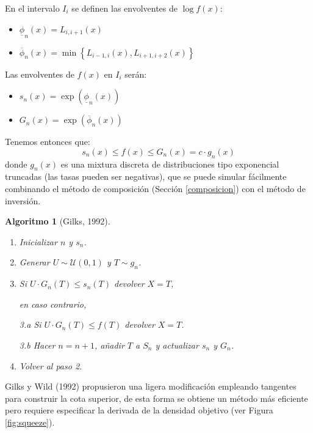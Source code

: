 \documentclass[
]{book}
\theoremstyle{break}
\newtheorem{conjecture}{Algoritmo}[chapter]
\theoremstyle{nonumberplain}
\begin{document}
En el intervalo \(I_{i}\) se definen las envolventes de \(\log f\left( x\right)\):

\begin{itemize}
\item
  \(\underline{\phi}_n(x)=L_{i,i+1}(x)\)
\item
  \(\overline{\phi}_n(x)=\min \left\{L_{i-1,i}(x),L_{i+1,i+2}(x)\right\}\)
\end{itemize}

Las envolventes de \(f(x)\) en \(I_{i}\) serán:

\begin{itemize}
\item
  \(s_n(x)=\exp \left( \underline{\phi}_n(x)\right)\)
\item
  \(G_n(x)=\exp \left( \overline{\phi}_n(x)\right)\)
\end{itemize}

Tenemos entonces que:
\[s_n(x)\leq f(x) \leq G_n(x)=c\cdot g_n(x)\]
donde \(g_n(x)\) es una mixtura discreta de distribuciones tipo exponencial truncadas (las tasas pueden ser negativas), que se puede simular fácilmente combinando el método de composición (Sección \ref{composicion}) con el método de inversión.

\begin{conjecture}[Gilks, 1992]
\protect\hypertarget{cnj:gilks}{}\label{cnj:gilks}

\begin{enumerate}
\def\labelenumi{\arabic{enumi}.}
\item
  Inicializar \(n\) y \(s_n\).
\item
  Generar \(U \sim \mathcal{U}(0, 1)\) y
  \(T\sim g_n\).
\item
  Si \(U\cdot G_n\left( T\right) \leq s_n\left( T\right)\)
  devolver \(X=T\),

  en caso contrario,

  3.a Si \(U\cdot G_n\left( T\right) \leq f\left( T\right)\)
  devolver \(X=T\).

  3.b Hacer \(n=n+1\), añadir \(T\) a \(S_n\)
  y actualizar \(s_n\) y \(G_n\).
\item
  Volver al paso 2.
\end{enumerate}

\end{conjecture}

Gilks y Wild (1992) propusieron una ligera modificación empleando tangentes para construir la cota superior, de esta forma se obtiene un método más eficiente pero requiere especificar la derivada de la densidad objetivo (ver Figura \ref{fig:squeeze}).
\end{document}
